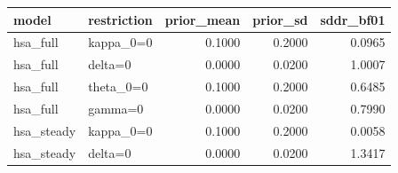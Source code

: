 \begin{tabular}{llrrr}
\toprule
model & restriction & prior\_mean & prior\_sd & sddr\_bf01 \\
\midrule
hsa\_full & kappa\_0=0 & 0.1000 & 0.2000 & 0.0965 \\
hsa\_full & delta=0 & 0.0000 & 0.0200 & 1.0007 \\
hsa\_full & theta\_0=0 & 0.1000 & 0.2000 & 0.6485 \\
hsa\_full & gamma=0 & 0.0000 & 0.0200 & 0.7990 \\
hsa\_steady & kappa\_0=0 & 0.1000 & 0.2000 & 0.0058 \\
hsa\_steady & delta=0 & 0.0000 & 0.0200 & 1.3417 \\
\bottomrule
\end{tabular}

